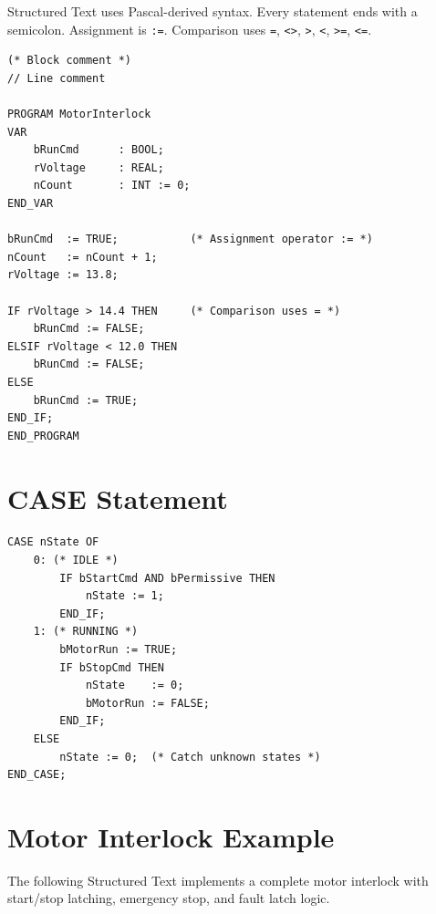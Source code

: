 \documentclass[12pt,twoside,openright]{memoir}
\begin{document}
Structured Text uses Pascal-derived syntax. Every statement ends with a semicolon. Assignment is \texttt{:=}. Comparison uses \texttt{=}, \texttt{<>}, \texttt{>}, \texttt{<}, \texttt{>=}, \texttt{<=}.

\begin{lstlisting}
(* Block comment *)
// Line comment

PROGRAM MotorInterlock
VAR
    bRunCmd      : BOOL;
    rVoltage     : REAL;
    nCount       : INT := 0;
END_VAR

bRunCmd  := TRUE;           (* Assignment operator := *)
nCount   := nCount + 1;
rVoltage := 13.8;

IF rVoltage > 14.4 THEN     (* Comparison uses = *)
    bRunCmd := FALSE;
ELSIF rVoltage < 12.0 THEN
    bRunCmd := FALSE;
ELSE
    bRunCmd := TRUE;
END_IF;
END_PROGRAM
\end{lstlisting}

\section{CASE Statement}

\begin{lstlisting}
CASE nState OF
    0: (* IDLE *)
        IF bStartCmd AND bPermissive THEN
            nState := 1;
        END_IF;
    1: (* RUNNING *)
        bMotorRun := TRUE;
        IF bStopCmd THEN
            nState    := 0;
            bMotorRun := FALSE;
        END_IF;
    ELSE
        nState := 0;  (* Catch unknown states *)
END_CASE;
\end{lstlisting}

\section{Motor Interlock Example}

The following Structured Text implements a complete motor interlock with start/stop latching, emergency stop, and fault latch logic.
\end{document}

